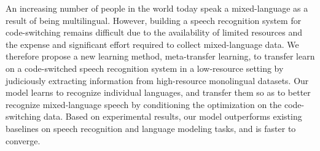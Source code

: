 An increasing number of people in the world today speak a mixed-language as a result of being multilingual. However, building a speech recognition system for code-switching remains difficult due to the availability of limited resources and the expense and significant effort required to collect mixed-language data. We therefore propose a new learning method, meta-transfer learning, to transfer learn on a code-switched speech recognition system in a low-resource setting by judiciously extracting information from high-resource monolingual datasets. Our model learns to recognize individual languages, and transfer them so as to better recognize mixed-language speech by conditioning the optimization on the code-switching data. Based on experimental results, our model outperforms existing baselines on speech recognition and language modeling tasks, and is faster to converge.
